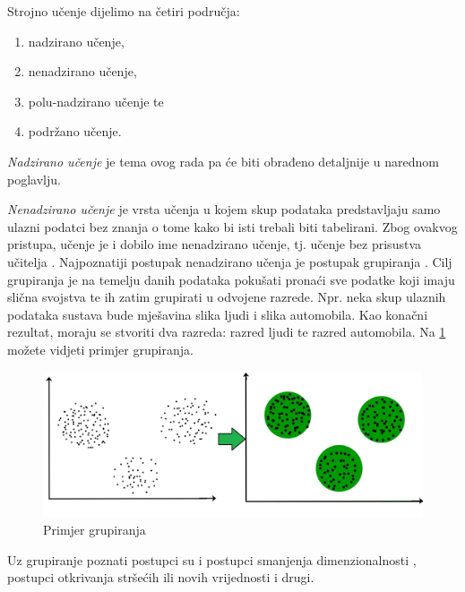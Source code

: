 \documentclass[times, utf8, zavrsni]{fer}
\begin{document}
Strojno učenje dijelimo na četiri područja:
\begin{center}
    \begin{enumerate}
        \item nadzirano učenje,
        \item nenadzirano učenje,
        \item polu-nadzirano učenje te
        \item podržano učenje.
    \end{enumerate}
\end{center}

\textit{Nadzirano učenje} je tema ovog rada pa će biti obrađeno detaljnije u narednom poglavlju.

\bigskip

\textit{Nenadzirano učenje}  je vrsta učenja u kojem skup podataka predstavljaju samo ulazni podatci bez znanja o tome kako bi isti trebali biti tabelirani. Zbog ovakvog pristupa, učenje je i dobilo ime nenadzirano učenje, tj. učenje bez prisustva učitelja . Najpoznatiji postupak nenadzirano učenja je postupak grupiranja . Cilj grupiranja je na temelju danih podataka pokušati pronaći sve podatke koji imaju slična svojstva te ih zatim grupirati u odvojene razrede. Npr. neka skup ulaznih podataka sustava bude mješavina slika ljudi i slika automobila. Kao konačni rezultat, moraju se stvoriti dva razreda: razred ljudi te razred automobila. Na \ref{fig:clustering} možete vidjeti primjer grupiranja.

\begin{figure}[H]
    \centering
    \includegraphics[scale=0.35]{img/clustering.jpg}
    \caption[Caption for LOF]{Primjer grupiranja\footnotemark}
    \label{fig:clustering}
\end{figure}

Uz grupiranje poznati postupci su i postupci smanjenja dimenzionalnosti , postupci otkrivanja stršećih ili novih vrijednosti  i drugi.
\end{document}
